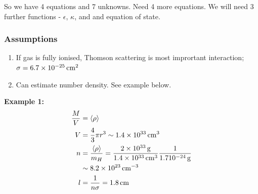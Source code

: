 \documentclass[a4paper]{article} %
\newcommand{\example}[2]
{
\begin{framed}
\textbf{Example #1:} #2
\end{framed}
}
\begin{document}
So we have 4 equations and 7 unknowns. Need 4 more equations. We will need 3 further functions - $\epsilon$, $\kappa$, and and equation of state.

\subsubsection{Assumptions}
\begin{enumerate}
\item If gas is fully ionised, Thomson scattering is most imprortant interaction; $\sigma=6.7\times\SI{d-25}{cm^2}$
\item Can estimate number density. See example below.
\end{enumerate}

\example{1}{
\begin{align*}
\frac{M}{V}&=\langle \rho \rangle\\
V&=\frac{4}{3}\pi r^3\sim 1.4\times \SI{d33}{cm^3}\\
n&=\frac{\langle \rho \rangle}{m_H}=\frac{\SI{2d33}{g}}{1.4\times\SI{d33}{cm^3}}\frac{1}{1.7\SI{d-24}{g}}\\
&\sim 8.2\times \SI{d23}{cm^{-3}}\\
l&=\frac{1}{n\sigma}=\SI{1.8}{cm}
\end{align*}
}



\pagebreak

\end{document}
